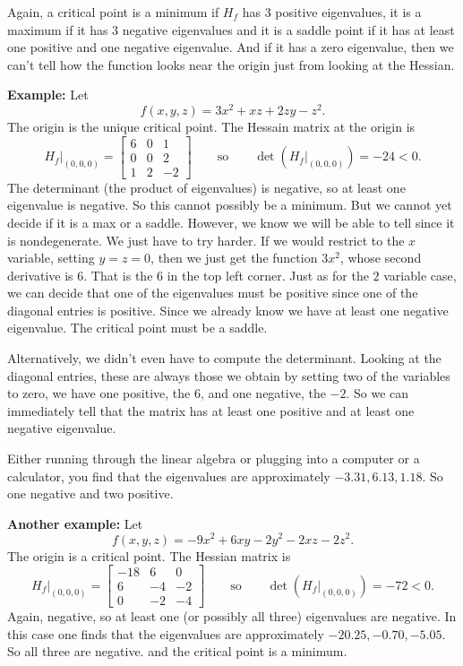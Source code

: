 \documentclass[12pt]{article}
\begin{document}
Again, a critical point is a minimum if $H_f$ has 3 positive eigenvalues, it
is a maximum if it has 3 negative eigenvalues and it is a saddle point if it
has at least one positive and one negative eigenvalue.  And if it has a
zero eigenvalue, then we can't tell how the function looks near the origin
just from looking at the Hessian.

\bigskip

\textbf{Example:}
Let
$$
f(x,y,z) = 3x^2 + xz + 2zy - z^2 .
$$
The origin is the unique critical point.
The Hessain matrix at the origin is
\begin{equation*}
H_f\big|_{(0,0,0)}
=
\begin{bmatrix}
6 & 0 & 1 \\
0 & 0 & 2 \\
1 & 2 & -2
\end{bmatrix}
\qquad
\text{so}
\qquad
\det(H_f\big|_{(0,0,0)}) = -24 < 0 .
\end{equation*}
The determinant (the product of eigenvalues)
is negative, so at least one eigenvalue is negative.  So this cannot
possibly be a minimum.  But we cannot yet decide if it is a max or a saddle.
However, we know we will be able to tell since it is nondegenerate.  We just
have to try harder.
If we would restrict to the $x$ variable, setting $y=z=0$, then we just
get the function $3x^2$, whose second derivative is $6$.  That is the $6$
in the top left corner.  Just as for the $2$ variable case, we can decide
that one of the eigenvalues must be positive since one of the diagonal
entries is positive.
Since we already know we have at least one negative eigenvalue.
The critical point must be a saddle.

Alternatively, we didn't even have to compute the determinant.  Looking at
the diagonal entries, these are always those we obtain by setting two of
the variables to zero, we have one positive, the $6$, and one negative, the
$-2$.  So we can immediately tell that the matrix has at least one positive and 
at least one negative eigenvalue.

Either running through the linear algebra or plugging into a
computer or a calculator, you find that
the eigenvalues are
approximately $-3.31, 6.13, 1.18$.  So one negative and two positive.

\bigskip

\textbf{Another example:}
Let
$$
f(x,y,z) = -9x^2 + 6xy -2y^2 -2xz -2 z^2 .
$$
The origin is a critical point.
The Hessian matrix is
\begin{equation*}
H_f\big|_{(0,0,0)}
=
\begin{bmatrix}
-18 & 6 & 0 \\
6 & -4 & -2 \\
0 & -2 & -4
\end{bmatrix}
\qquad
\text{so}
\qquad
\det(H_f\big|_{(0,0,0)}) = -72 < 0 .
\end{equation*}
Again, negative, so at least one (or possibly all three) eigenvalues are
negative.  In this case one finds that the eigenvalues are
approximately $-20.25, -0.70, -5.05$.  So all three are negative.
and the critical point is a minimum.
\end{document}
